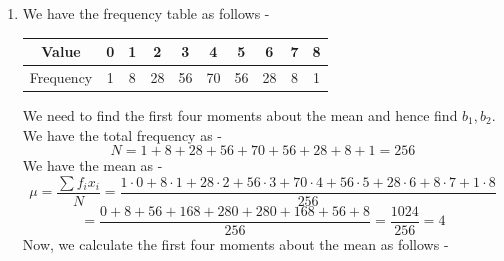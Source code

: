 \begin{enumerate}
\begin{enumerate}
        We have the formula for third central moment in terms of moments as -
        \[\mu_3 = m_3 - 3m_1 m_2 + 2m_1^3\]
        where $\mu_3$ is the third central moment, $m_3$ is the third moment around the origin and $m_1, m_2$ are the first and second moments around the origin respectively. \\
        Substituting the values, we get -
        \[64 = m_3 - 3 \cdot 10 \cdot 116 + 2 \cdot 10^3\]
        \[\Rightarrow 64 = m_3 - 3480 + 2000\]
        \[\Rightarrow m_3 = 64 + 3480 - 2000 = 1544\]
        \[\boxed{m_3 = 1544
        }\]
        \item $m_4$:
        We have the formula for coefficient of kurtosis in terms of moments as -
        \[b_2 = \frac{m_4 - 4m_1 m_3 + 6m_1^2 m_2 - 3m_1^4}{(m_2 - m_1^2)^2}\]
        where $b_2$ is the coefficient of kurtosis, $m_4$ is the fourth moment around the origin and $m_1, m_2, m_3$ are the first, second and third moments around the origin respectively. \\
        Substituting the values, we get -
        \[4 = \frac{m_4 - 4 \cdot 10 \cdot 1544 + 6 \cdot 10^2 \cdot 116 - 3 \cdot 10^4}{(116 - 10^2)^2}\]
        \[= \frac{m_4 - 61760 + 69600 - 30000}{16^2}\]
        \[= \frac{m_4 - 22160}{256}\]
        \[\Rightarrow 4 \cdot 256 = m_4 - 22160\]
        \[\Rightarrow m_4 = 1024 + 22160 = 23184\]
        \[\boxed{m_4 = 23184
        }\]
    \end{enumerate}
    \item We have the frequency table as follows -
    \begin{center}
        \begin{tabular}{|c|ccccccccc|}
            \hline
            Value & 0 & 1 & 2 & 3 & 4 & 5 & 6 & 7 & 8 \\
            \hline
            Frequency & 1 & 8 & 28 & 56 & 70 & 56 & 28 & 8 & 1 \\
            \hline
        \end{tabular}
    \end{center}
    We need to find the first four moments about the mean and hence find $b_1, b_2$. 
    We have the total frequency as -
    \[N = 1 + 8 + 28 + 56 + 70 + 56 + 28 + 8 + 1 = 256\]
    We have the mean as -
    \[\mu = \frac{\sum f_i x_i}{N} = \frac{1 \cdot 0 + 8 \cdot 1 + 28 \cdot 2 + 56 \cdot 3 + 70 \cdot 4 + 56 \cdot 5 + 28 \cdot 6 + 8 \cdot 7 + 1 \cdot 8}{256}\]
    \[= \frac{0 + 8 + 56 + 168 + 280 + 280 + 168 + 56 + 8}{256} = \frac{1024}{256} = 4\]
    Now, we calculate the first four moments about the mean as follows -

\end{enumerate}
